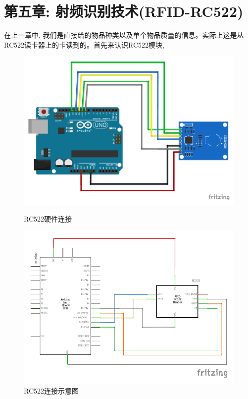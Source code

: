 \documentclass{article}
\begin{document}
\section{第五章: 射频识别技术(RFID-RC522)}
在上一章中, 我们是直接给的物品种类以及单个物品质量的信息。实际上这是从RC522读卡器上的卡读到的。首先来认识RC522模块,
\begin{figure}[h]
	\centering
	\begin{minipage}{.45\textwidth}
		\centering
		\includegraphics[width=\linewidth]{../Picture/RFID_RC522.pdf}
		\caption{RC522硬件连接}
		\label{fig:RC522硬件连接}
	\end{minipage}%
	\hfill
	\begin{minipage}{.45\textwidth}
		\centering
		\includegraphics[width=\linewidth]{../Picture/RFID_RC522_line.pdf}
		\caption{RC522连接示意图}
		\label{fig:RC522连接示意图}
	\end{minipage}
\end{figure}
\end{document}
